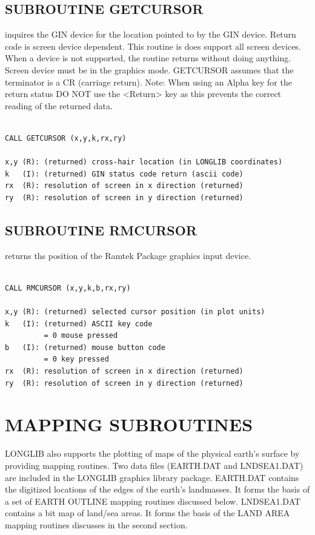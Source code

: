 \documentclass[11pt]{report}
\begin{document}
\section{SUBROUTINE GETCURSOR}

 inquires the  GIN device for the location
pointed to by the GIN device.  Return code is screen device dependent.
This routine is does support all screen devices.  When a device is not
supported, the routine returns without doing anything.  Screen device
must be in the graphics mode.  GETCURSOR assumes that the 
terminator is a CR (carriage return).  Note: When using an Alpha key
for the return status DO NOT use the <Return> key as this prevents the
correct reading of the returned data.
\begin{verbatim}

CALL GETCURSOR (x,y,k,rx,ry)

x,y (R): (returned) cross-hair location (in LONGLIB coordinates)
k   (I): (returned) GIN status code return (ascii code)
rx  (R): resolution of screen in x direction (returned)
ry  (R): resolution of screen in y direction (returned)
\end{verbatim}

\section{SUBROUTINE RMCURSOR}

 returns ths position of the Ramtek Package graphics input
device.
\begin{verbatim}

CALL RMCURSOR (x,y,k,b,rx,ry)

x,y (R): (returned) selected cursor position (in plot units)
k   (I): (returned) ASCII key code
         = 0 mouse pressed
b   (I): (returned) mouse button code
         = 0 key pressed
rx  (R): resolution of screen in x direction (returned)
ry  (R): resolution of screen in y direction (returned)
\end{verbatim}


\chapter{MAPPING SUBROUTINES}


LONGLIB also supports the plotting of maps of the physical earth's surface
by providing mapping routines.
Two data files (EARTH.DAT and LNDSEA1.DAT) are included in the LONGLIB
graphics library package.  EARTH.DAT contains the digitized locations of
the edges of the earth's landmasses.  It forms the basis of a set of 
EARTH OUTLINE mapping routines discussed below.  LNDSEA1.DAT contains a bit map
of land/sea areas.  It forms the basis of the LAND AREA mapping routines discusses
in the second section.
\end{document}
